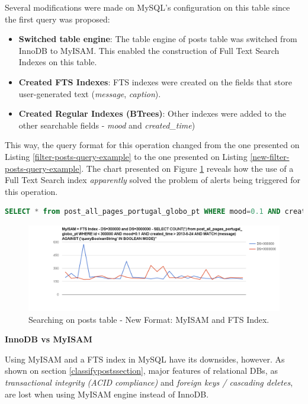 Several modifications were made on MySQL's configuration on this table since the first query was proposed:
\begin{itemize}
\item{\textbf{Switched table engine}: The table engine of posts table was switched from InnoDB to MyISAM. This enabled the construction of Full Text Search Indexes on this table.}
\item{\textbf{Created FTS Indexes}: FTS indexes were created on the fields that store user-generated text (\textit{message}, \textit{caption}).}
\item{\textbf{Created Regular Indexes (BTrees)}: Other indexes were added to the other searchable fields - \textit{mood} and \textit{created\_time})}
\end{itemize}

This way, the query format for this operation changed from the one presented on Listing \ref{filter-posts-query-example} to the one presented on Listing \ref{new-filter-posts-query-example}. The chart presented on Figure \ref{fig:myISAM-FTSIndex} reveals how the use of a Full Text Search index \textit{apparently} solved the problem of alerts being triggered for this operation.  

\begin{lstlisting}[language=SQL,firstnumber=1, caption=New filter posts query format, label=new-filter-posts-query-example]
SELECT * from post_all_pages_portugal_globo_pt WHERE mood=0.1 AND created_time > 2013-5-24 AND MATCH (message) AGAINST ('booleanSearchString' IN BOOLEAN MODE)
\end{lstlisting} 


\begin{figure}[ht!]
	\centering
	\includegraphics[width=150mm]{Imagens/myISAM-FTSIndex.png}
	\caption{Searching on posts table - New Format: MyISAM and FTS Index. \label{fig:myISAM-FTSIndex}}
\end{figure}


\noindent \textbf{InnoDB vs MyISAM}

Using MyISAM and a FTS index in MySQL have its downsides, however. As shown on section \ref{classifypostssection}, major features of relational DBs, as \textit{transactional integrity (ACID compliance)} and \textit{foreign keys / cascading deletes},  are lost when using MyISAM engine instead of InnoDB. 

